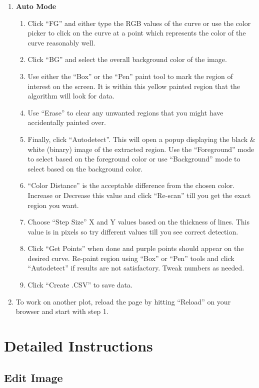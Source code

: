 \documentclass[letterpaper, 11pt]{article}
\begin{document}
\begin{enumerate}
\item{{\bf Auto Mode}
\begin{enumerate}
\item{Click ``FG'' and either type the RGB values of the curve or use the color picker to click on the curve at a point which represents the color of the curve reasonably well. }
\item{Click ``BG'' and select the overall background color of the image. }
\item{Use either the ``Box'' or the ``Pen'' paint tool to mark the region of interest on the screen. It is within this yellow painted region that the algorithm will look for data.}
\item{Use ``Erase'' to clear any unwanted regions that you might have accidentally painted over.}
\item{Finally, click ``Autodetect''. This will open a popup displaying the black \& white (binary) image of the extracted region. Use the ``Foreground'' mode to select based on the foreground color or use ``Background'' mode to select based on the background color. }
\item{``Color Distance'' is the acceptable difference from the chosen color. Increase or Decrease this value and click ``Re-scan'' till you get the exact region you want.}
\item{Choose ``Step Size'' X and Y values based on the thickness of lines. This value is in pixels so try different values till you see correct detection. }
\item{Click ``Get Points'' when done and purple points should appear on the desired curve. Re-paint region using ``Box'' or ``Pen'' tools and click ``Autodetect'' if results are not satisfactory. Tweak numbers as needed.}
\item{Click ``Create .CSV'' to save data.}
\end{enumerate}
}
\item{To work on another plot, reload the page by hitting ``Reload'' on your browser and start with step 1.}
\end{enumerate}

\section{Detailed Instructions}

\subsection{Edit Image}
\end{document}
